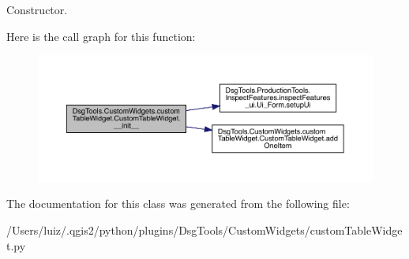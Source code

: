 \begin{DoxyVerb}Constructor.\end{DoxyVerb}
 Here is the call graph for this function\+:
\nopagebreak
\begin{figure}[H]
\begin{center}
\leavevmode
\includegraphics[width=350pt]{class_dsg_tools_1_1_custom_widgets_1_1custom_table_widget_1_1_custom_table_widget_a08a824e5e61d0ac76042d74992532571_cgraph}
\end{center}
\end{figure}


The documentation for this class was generated from the following file\+:\begin{DoxyCompactItemize}
\item 
/\+Users/luiz/.\+qgis2/python/plugins/\+Dsg\+Tools/\+Custom\+Widgets/custom\+Table\+Widget.\+py\end{DoxyCompactItemize}
